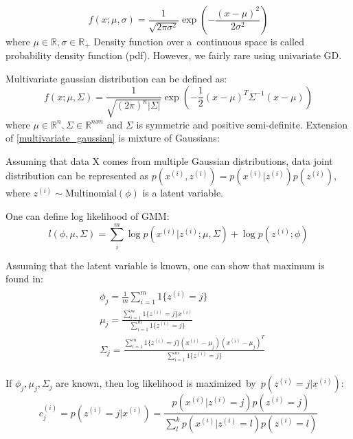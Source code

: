 \begin{equation}
	f(x;\mu,\sigma) = \frac {1}{\sqrt{2\pi\sigma^2}}\exp\left(-\frac{(x-\mu)^2}{2\sigma ^ 2}\right)
	\label{Gaussion Distribution}
\end{equation}
where $\mu \in \mathbb{R}, \sigma \in \mathbb{R}_+$
Density function over a~continuous space is called probability density function (pdf). However, we fairly rare using univariate GD.

Multivariate gaussian distribution can be defined as:
\begin{equation}
	f(x;\mu,\Sigma) = \frac{1}{\sqrt{(2\pi)^n|\Sigma|}}\exp \left( -\frac{1}{2}(x-\mu)^T\Sigma^{-1}(x-\mu) \right)
	\label{multivariate_gaussian}
\end{equation}
where $\mu \in \mathbb{R}^n, \Sigma \in \mathbb{R}^{nxn}$ and $\Sigma$ is symmetric and positive semi-definite.
Extension of \eqref{multivariate_gaussian} is mixture of Gaussians:

Assuming that data X comes from multiple Gaussian distributions, data joint distribution can be represented as $p(x^{(i)},z^{(i)})=p(x^{(i)}|z^{(i)})p(z^{(i)})$, where $z^{(i)}\sim\text{Multinomial}(\phi)$  is a latent variable.

One can define log likelihood of GMM:
\begin{equation}
	l(\phi,\mu,\Sigma)=\sum\limits^m_i \log p(x^{(i)}|z^{(i)};\mu,\Sigma) + \log p(z^{(i)};\phi)
\end{equation}

Assuming that the latent variable is known, one can show that maximum is found in:
\begin{align}
\begin{split}
	\label{gmm_max}
	& \phi_j = \frac{1}{m}\sum\limits^m_{i=1}1\{z^{(i)}=j\} \\
	& \mu_j = \frac{\sum\limits_{i=1}^m1\{z^{(i)}=j\}x^{(i)}}{\sum\limits_{i=1}^m1\{z^{(i)}=j\}} \\
	& \Sigma_j = \frac{\sum\limits_{i=1}^m1\{z^{(i)}=j\}(x^{(i)}-\mu_j)(x^{(i)}-\mu_j)^T}{\sum\limits_{i=1}^m1\{z^{(i)}=j\}}
\end{split}
\end{align}

If $\phi_j, \mu_j, \Sigma_j$ are known, then log likelihood is maximized~by~$p(z^{(i)}=j|x^{(i)})$:
\begin{equation}
	\label{gmm_exp}
	c_{j}^{(i)}=p(z^{(i)}=j|x^{(i)}) = \frac{p(x^{(i)}|z^{(i)}=j)p(z^{(i)}=j)}{\sum\limits^k_l p(x^{(i)}|z^{(i)}=l)p(z^{(i)}=l)}
\end{equation}

